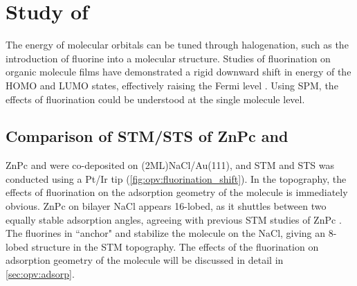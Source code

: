 








\section{Study of }

The energy of molecular orbitals can be tuned through halogenation, such as the introduction of fluorine into a molecular structure. Studies of fluorination on organic molecule films have demonstrated a rigid downward shift in energy of the HOMO and LUMO states, effectively raising the Fermi level \citep{schwarze2016band,warren2019controlling}. Using \ac{SPM}, the effects of fluorination could be understood at the single molecule level. 

\subsection{Comparison of STM/STS of ZnPc and }

ZnPc and  were co-deposited on (2ML)NaCl/Au(111), and STM and STS was conducted using a Pt/Ir tip (\autoref{fig:opv:fluorination_shift}). In the topography, the effects of fluorination on the adsorption geometry of the molecule is immediately obvious. ZnPc on bilayer NaCl appears 16-lobed, as it shuttles between two equally stable adsorption angles, agreeing with previous \ac{STM} studies of ZnPc \citep{Miwa2016, Imada2016}. The fluorines in  ``anchor" and stabilize the molecule on the NaCl, giving an 8-lobed structure in the STM topography. The effects of the fluorination on adsorption geometry of the molecule will be discussed in detail in \autoref{sec:opv:adsorp}. 


